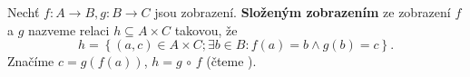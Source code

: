 \begin{definition}
  Nechť $f:A\to B, g:B\to C$ jsou zobrazení. \textbf{Složeným zobrazením} ze zobrazení $f$ a $g$ nazveme relaci $h\subseteq A\times C$ takovou, že
  \[
    h=\left\{ (a,c)\in A\times C;\exists b\in B: f(a)=b \land g(b)=c \right\}.
  \]
  Značíme $c=g(f(a))$, $h=g\, \circ \, f $ (čteme ).
\end{definition}
